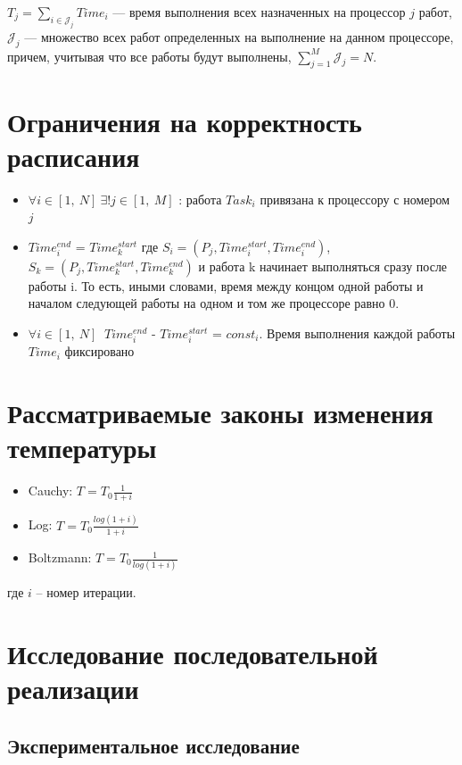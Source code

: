 \documentclass{article}
\begin{document}
$ T_j = \sum_{i \in \mathcal{J}_j} Time_i $ --- время выполнения всех назначенных на процессор \( j \) работ, $\mathcal{J}_j $ --- множество всех работ определенных на выполнение на данном процессоре, причем, учитывая что все работы будут выполнены, $ \sum_{j=1}^{M} \mathcal{J}_j = N$.

\section{Ограничения на корректность расписания}

\begin{itemize}
    \item $\forall i \in [1,\ N]\ \exists !j \in [1,\ M]$ : работа $Task_i$ привязана к процессору с  номером $j$
    \item $Time_i^{end}$ = $Time_k^{start}$ где $S_i = (P_j, Time_i^{start}, Time_i^{end})$, $S_k = (P_j, Time_k^{start}, Time_k^{end})$ и работа k начинает выполняться сразу после работы i. То есть, иными словами, время между концом одной работы и началом следующей работы на одном и том же процессоре равно 0.
    \item $\forall i \in [1,\ N]\ $  $Time_i^{end}$ - $Time_i^{start}$ = $const_i$. Время выполнения каждой работы \( Time_i \) фиксировано
\end{itemize}




\section{Рассматриваемые законы изменения температуры}

\begin{itemize}
    \item Cauchy: $T = T_0\frac{1}{1 + i}$
    \item Log: $T = T_0\frac{log(1+i)}{1 + i}$
    \item Boltzmann: $T = T_0\frac{1}{log(1 + i)}$
\end{itemize}
где $i$ -- номер итерации.


\newpage
\section{Исследование последовательной реализации}
\subsection{Экспериментальное исследование}
\end{document}
